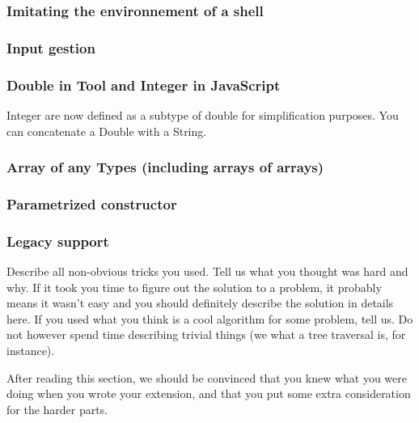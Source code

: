 \subsubsection{Imitating the environnement of a shell}
\subsubsection{Input gestion}
\subsubsection{Double in Tool and Integer in JavaScript}
Integer are now defined as a subtype of double for simplification purposes.
You can concatenate a Double with a String.
\subsubsection{Array of any Types (including arrays of arrays)}
\subsubsection{Parametrized constructor}
\subsubsection{Legacy support}



Describe all non-obvious tricks you used. Tell us what you thought was hard and
why. If it took you time to figure out the solution to a problem, it probably
means it wasn't easy and you should definitely describe the solution in details
here. If you used what you think is a cool algorithm for some problem, tell us.
Do not however spend time describing trivial things (we what a tree traversal
is, for instance). 

After reading this section, we should be convinced that you knew what you were
doing when you wrote your extension, and that you put some extra consideration
for the harder parts.

